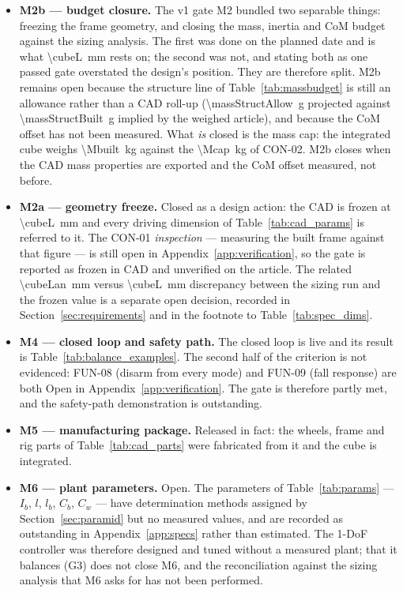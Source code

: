 \begin{itemize}
\item \textbf{M2b --- budget closure.} The v1 gate M2 bundled two separable
things: freezing the frame geometry, and closing the mass, inertia and CoM
budget against the sizing analysis. The first was done on the planned date and
is what \qty{\cubeL}{\milli\metre} rests on; the second was not, and stating
both as one passed gate overstated the design's position. They are therefore
split. M2b remains open because the structure line of
Table~\ref{tab:massbudget} is still an allowance rather than a CAD roll-up
(\qty{\massStructAllow}{\gram} projected against \qty{\massStructBuilt}{\gram}
implied by the weighed article), and because the CoM offset has not been
measured. What \emph{is} closed is the
mass cap: the integrated cube weighs \qty{\Mbuilt}{\kilo\gram} against the
\qty{\Mcap}{\kilo\gram} of CON-02. M2b closes when the CAD mass properties are
exported and the CoM offset measured, not before.

\item \textbf{M2a --- geometry freeze.} Closed as a design action: the CAD is
frozen at \qty{\cubeL}{\milli\metre} and every driving dimension of
Table~\ref{tab:cad_params} is referred to it. The CON-01 \emph{inspection} ---
measuring the built frame against that figure --- is still open in
Appendix~\ref{app:verification}, so the gate is reported as frozen in CAD and
unverified on the article. The related \qty{\cubeLan}{\milli\metre} versus
\qty{\cubeL}{\milli\metre} discrepancy between the sizing run and the frozen
value is a separate open decision, recorded in
Section~\ref{sec:requirements} and in the footnote to
Table~\ref{tab:spec_dims}.

\item \textbf{M4 --- closed loop and safety path.} The closed loop is live and
its result is Table~\ref{tab:balance_examples}. The second half of the
criterion is not evidenced: FUN-08 (disarm from every mode) and FUN-09 (fall
response) are both Open in Appendix~\ref{app:verification}. The gate is
therefore partly met, and the safety-path demonstration is outstanding.

\item \textbf{M5 --- manufacturing package.} Released in fact: the wheels,
frame and rig parts of Table~\ref{tab:cad_parts} were fabricated from it and
the cube is integrated.

\item \textbf{M6 --- plant parameters.} Open. The parameters of
Table~\ref{tab:params} --- $I_b$, $l$, $l_b$, $C_b$, $C_w$ --- have
determination methods assigned by Section~\ref{sec:paramid} but no measured
values, and are recorded as outstanding in Appendix~\ref{app:specs} rather than
estimated. The 1-DoF controller was therefore designed and tuned without a
measured plant; that it balances (G3) does not close M6, and the reconciliation
against the sizing analysis that M6 asks for has not been performed.


\end{itemize}
